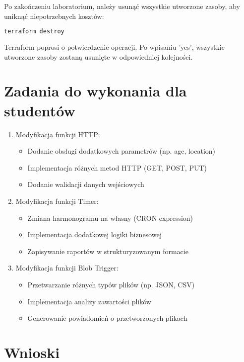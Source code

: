 \documentclass{article}
\begin{document}
Po zakończeniu laboratorium, należy usunąć wszystkie utworzone zasoby, aby uniknąć niepotrzebnych kosztów:

\begin{lstlisting}[language=bash]
terraform destroy
\end{lstlisting}

Terraform poprosi o potwierdzenie operacji. Po wpisaniu 'yes', wszystkie utworzone zasoby zostaną usunięte w odpowiedniej kolejności.

\section{Zadania do wykonania dla studentów}

\begin{enumerate}
    \item Modyfikacja funkcji HTTP:
    \begin{itemize}
        \item Dodanie obsługi dodatkowych parametrów (np. age, location)
        \item Implementacja różnych metod HTTP (GET, POST, PUT)
        \item Dodanie walidacji danych wejściowych
    \end{itemize}
    
    \item Modyfikacja funkcji Timer:
    \begin{itemize}
        \item Zmiana harmonogramu na własny (CRON expression)
        \item Implementacja dodatkowej logiki biznesowej
        \item Zapisywanie raportów w strukturyzowanym formacie
    \end{itemize}
    
    \item Modyfikacja funkcji Blob Trigger:
    \begin{itemize}
        \item Przetwarzanie różnych typów plików (np. JSON, CSV)
        \item Implementacja analizy zawartości plików
        \item Generowanie powiadomień o przetworzonych plikach
    \end{itemize}
\end{enumerate}

\section{Wnioski}
\end{document}

